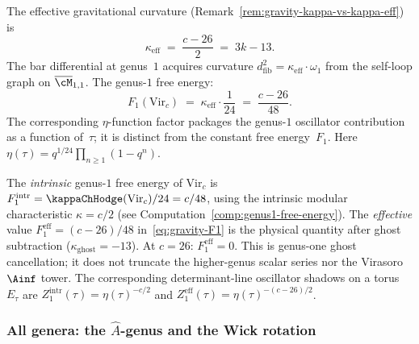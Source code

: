 The effective gravitational curvature
(Remark~\ref{rem:gravity-kappa-vs-kappa-eff}) is
\begin{equation}\label{eq:gravity-kappa}
\kappa_{\mathrm{eff}}
\;=\;
\frac{c - 26}{2}
\;=\;
3k - 13.
\end{equation}
The bar differential at genus~$1$ acquires curvature
$d_{\mathrm{fib}}^2 = \kappa_{\mathrm{eff}} \cdot \omega_1$
from the self-loop graph on $\overline{\cM}_{1,1}$. The genus-$1$
free energy:
\begin{equation}\label{eq:gravity-F1}
F_1(\mathrm{Vir}_c)
\;=\;
\kappa_{\mathrm{eff}} \cdot \frac{1}{24}
\;=\;
\frac{c - 26}{48}.
\end{equation}
The corresponding $\eta$-function factor packages the
genus-$1$ oscillator contribution as a function of~$\tau$; it
is distinct from the constant free energy~$F_1$.
Here $\eta(\tau) = q^{1/24}\prod_{n \ge 1}(1 - q^n)$.

\begin{remark}
\label{rem:gravity-F1-intrinsic-vs-effective}
The \emph{intrinsic} genus-$1$ free energy of $\mathrm{Vir}_c$ is
$F_1^{\mathrm{intr}} = \kappaChHodge(\mathrm{Vir}_c)/24 = c/48$,
using the intrinsic modular characteristic $\kappa = c/2$
(see Computation~\ref{comp:genus1-free-energy}).
The \emph{effective} value $F_1^{\mathrm{eff}} = (c-26)/48$
in~\eqref{eq:gravity-F1} is the physical quantity after
ghost subtraction ($\kappa_{\mathrm{ghost}} = -13$). At
$c = 26$: $F_1^{\mathrm{eff}} = 0$. This is genus-one ghost
cancellation; it does not truncate the higher-genus scalar series nor
the Virasoro $\Ainf$ tower.
The corresponding determinant-line oscillator shadows on a torus~$E_\tau$
are $Z_1^{\mathrm{intr}}(\tau) = \eta(\tau)^{-c/2}$ and
$Z_1^{\mathrm{eff}}(\tau) = \eta(\tau)^{-(c-26)/2}$.
\end{remark}

\subsubsection*{All genera: the $\hat A$-genus and the Wick rotation}

